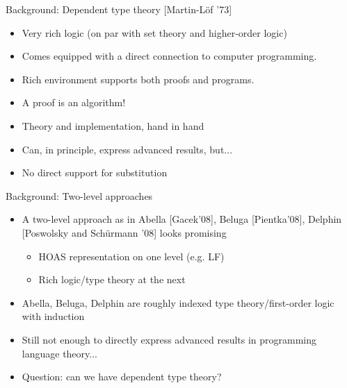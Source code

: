 \documentclass[usenames,dvipsnames]{beamer}
\begin{document}
\begin{frame}{Background: Dependent type theory [Martin-L\"of '73]}
\begin{itemize}
\item Very rich logic (on par with set theory and higher-order logic)
\item Comes equipped with a direct
connection to computer programming.
\item Rich environment supports both proofs and programs.
\item A proof is an algorithm!
\item Theory and implementation, hand in hand
\item Can, in principle, express advanced results, but...
\item No direct support for substitution
\end{itemize}
\end{frame}

\begin{frame}{Background: Two-level approaches}
\begin{itemize}
\item A two-level approach as in Abella [Gacek'08], Beluga [Pientka'08], Delphin [Poswolsky and Sch\"urmann '08] looks promising
\begin{itemize}
\item HOAS representation on one level (e.g. LF)
\item Rich logic/type theory at the next
\end{itemize}
\item Abella, Beluga, Delphin are roughly indexed type theory/first-order logic with induction
\item Still not enough to directly express advanced results in programming language theory...
\pause \item Question: can we have dependent type theory?
\end{itemize}
\end{frame}
\end{document}
